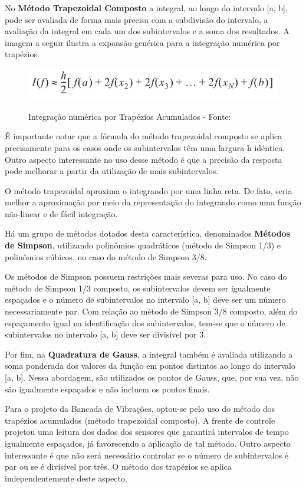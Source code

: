 No {\textbf{Método Trapezoidal Composto}} a integral, ao longo do intervalo [a, b], pode ser avaliada de forma mais precisa com a subdivisão do 
intervalo, a avaliação da integral em cada um dos subintervalos e a soma dos resultados. A imagem a seguir ilustra a expansão genérica para a 
integração numérica por trapézios.

\begin{figure}[H]
\centering
\includegraphics[keepaspectratio=true,scale=0.52]	{figuras/metodo_trapezoidal.png}
\label{fig:metodo_trapezoidal}
\caption{Integração numérica por Trapézios Acumulados - Fonte: }
\end{figure}

É importante notar que a fórmula do método trapezoidal composto se aplica precisamente para os casos onde os subintervalos têm uma largura h
idêntica. Outro aspecto interessante no uso desse método é que a precisão da resposta pode melhorar a partir da utilização de mais subintervalos.

O método trapezoidal aproxima o integrando por uma linha reta. De fato, seria melhor a aproximação por meio da representação do integrando 
como uma função não-linear e de fácil integração.

Há um grupo de métodos dotados desta característica, denominados \textbf{Métodos de Simpson}, utilizando polinômios quadráticos (método de
Simpson 1/3) e polinômios cúbicos, no caso do método de Simpson 3/8.

Os métodos de Simpson possuem restrições mais severas para uso. No caso do método de Simpson 1/3 composto, os subintervalos devem ser 
igualmente espaçados e o número de subintervalos no intervalo [a, b] deve ser um número necessariamente par. Com relação ao método de Simpson 
3/8 composto, além do espaçamento igual na identificação dos subintervalos, tem-se que o número de subintervalos no intervalo [a, b] deve ser 
divisível por 3.

Por fim, na \textbf{Quadratura de Gauss}, a integral também é avaliada utilizando a soma ponderada dos valores da função em pontos distintos 
ao longo do intervalo [a, b]. Nessa abordagem, são utilizados os pontos de Gauss, que, por sua vez, não são igualmente espaçados e não incluem 
os pontos finais.

Para o projeto da Bancada de Vibrações, optou-se pelo uso do método dos trapézios acumulados (método trapezoidal composto). A frente de 
controle projetou uma leitura dos dados dos sensores que garantirá intervalos de tempo igualmente espaçados, já favorecendo a aplicação de 
tal método. Outro aspecto interessante é que não será necessário controlar se o número de subintervalos é par ou se é divisível por três. 
O método dos trapézios se aplica independentemente deste aspecto.

